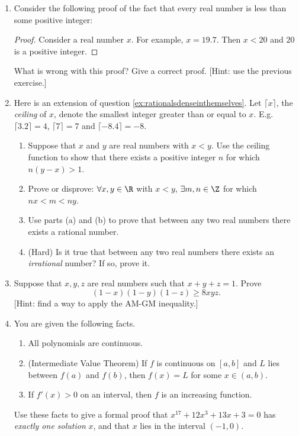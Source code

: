 \begin{enumerate}
    \item Consider the following proof of the fact that every real number is less than some positive integer:
  \begin{proof}
      Consider a real number $x$. For example, $x = 19.7$. Then $x < 20$ and $20$ is a positive integer. 
  \end{proof}
  What is wrong with this proof? Give a correct proof. [Hint: use the previous exercise.]
	
	\item Here is an extension of question \ref{ex:rationalsdenseinthemselves}. Let $\lceil x\rceil$, the \emph{ceiling} of $x$, denote the smallest integer greater than or equal to $x$. E.g.\ $\lceil 3.2\rceil=4$, $\lceil 7\rceil=7$ and $\lceil -8.4\rceil=-8$.
	\begin{enumerate}
  	\item Suppose that $x$ and $y$ are real numbers with $x<y$. Use the ceiling function to show that there exists a positive integer $n$ for which $n(y-x)>1$.
  	\item Prove or disprove: $\forall x,y\in\R$ with $x<y$, $\exists m,n\in\Z$ for which $nx<m<ny$.
  	\item Use parts (a) and (b) to prove that between any two real numbers there exists a rational number.
  	\item (Hard) Is it true that between any two real numbers there exists an \emph{irrational} number? If so, prove it.
	\end{enumerate}
	
	\item Suppose that $x,y,z$ are real numbers such that $x + y + z = 1$. Prove
    \[  
        (1 - x)(1 - y)(1 - z) \geq 8 xyz.
    \]
    [Hint: find a way to apply the AM-GM inequality.]
    
	
  \item You are given the following facts.
  \begin{enumerate}
    \item All polynomials are continuous.
    \item (Intermediate Value Theorem) If $f$ is continuous on $[a,b]$ and $L$ lies between $f(a)$ and $f(b)$, then $f(x)=L$ for some $x\in(a,b)$.
    \item If $f'(x)>0$ on an interval, then $f$ is an increasing function.
	\end{enumerate}
	Use these facts to give a formal proof that $x^{17}+12x^3+13x+3=0$ has \emph{exactly one solution} $x$, and that $x$ lies in the interval $(-1,0)$.
	

\end{enumerate}
